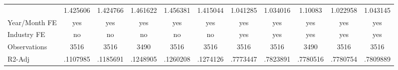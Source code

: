 \begin{table}[htbp]
\begin{tabular}{l*{10}{c}}
                & 1.425606         & 1.424766         & 1.461622         & 1.456381         & 1.415044         & 1.041285         & 1.034016         &  1.10083         & 1.022958         & 1.043145         \\
Year/Month FE   &      yes         &      yes         &      yes         &      yes         &      yes         &      yes         &      yes         &      yes         &      yes         &      yes         \\
Industry FE     &       no         &       no         &       no         &       no         &       no         &      yes         &      yes         &      yes         &      yes         &      yes         \\
Observations    &     3516         &     3516         &     3490         &     3516         &     3516         &     3516         &     3516         &     3490         &     3516         &     3516         \\
R2-Adj          & .1107985         & .1185691         & .1248905         & .1260208         & .1274126         & .7773447         & .7823891         & .7780516         & .7780754         & .7809889         \\
\end{tabular}
\end{table}
